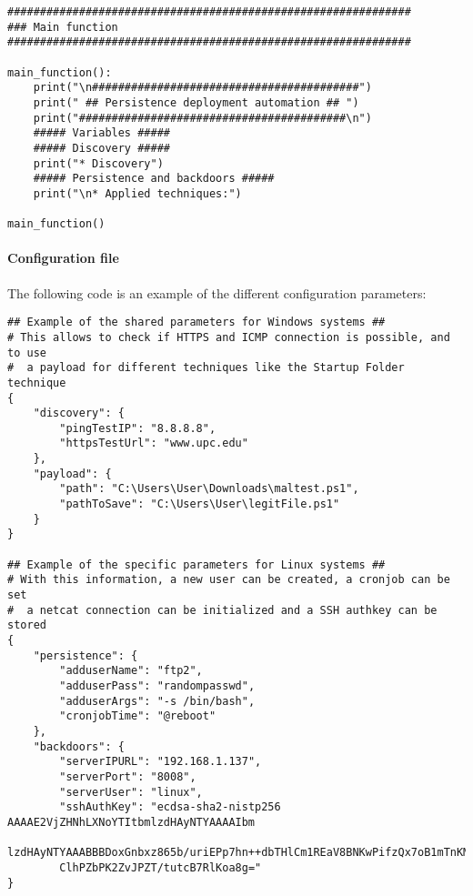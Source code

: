 \begin{verbatim}
##############################################################
### Main function
##############################################################

main_function():
    print("\n#########################################")
    print(" ## Persistence deployment automation ## ")
    print("#########################################\n")
    ##### Variables #####  
    ##### Discovery #####
    print("* Discovery")    
    ##### Persistence and backdoors #####
    print("\n* Applied techniques:")

main_function()
\end{verbatim}

\pagebreak
\paragraph{Configuration file}
The following code is an example of the different configuration parameters:
\begin{verbatim}
## Example of the shared parameters for Windows systems ##
# This allows to check if HTTPS and ICMP connection is possible, and to use
#  a payload for different techniques like the Startup Folder technique 
{
    "discovery": {
        "pingTestIP": "8.8.8.8",
        "httpsTestUrl": "www.upc.edu"
    },
    "payload": {
        "path": "C:\Users\User\Downloads\maltest.ps1",
        "pathToSave": "C:\Users\User\legitFile.ps1"
    }
}

## Example of the specific parameters for Linux systems ##
# With this information, a new user can be created, a cronjob can be set
#  a netcat connection can be initialized and a SSH authkey can be stored
{
    "persistence": {
        "adduserName": "ftp2",
        "adduserPass": "randompasswd",
        "adduserArgs": "-s /bin/bash",
        "cronjobTime": "@reboot"
    },
    "backdoors": {
        "serverIPURL": "192.168.1.137",
        "serverPort": "8008",
        "serverUser": "linux",
        "sshAuthKey": "ecdsa-sha2-nistp256 AAAAE2VjZHNhLXNoYTItbmlzdHAyNTYAAAAIbm
        lzdHAyNTYAAABBBDoxGnbxz865b/uriEPp7hn++dbTHlCm1REaV8BNKwPifzQx7oB1mTnKMn
        ClhPZbPK2ZvJPZT/tutcB7RlKoa8g="
}
\end{verbatim}
